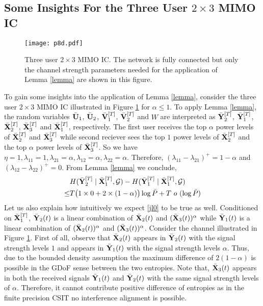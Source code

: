 \documentclass[11pt]{article}
\begin{document}
\subsection{Some Insights For the Three User $2\times3$ MIMO IC}
\begin{figure}[!h]
\centerline{\texttt{[image: p8d.pdf]}}
\caption{ Three user $2\times3$ MIMO IC. The network is fully connected but only the channel strength parameters needed for the application of Lemma \ref{lemma} are shown in this figure.}\label{fig:intuit-}
\end{figure}
To gain some insights into the application of Lemma \ref{lemma}, consider the three user $2\times3$ MIMO IC illustrated in Figure \ref{fig:intuit-} for $\alpha\le1$. To apply Lemma \ref{lemma}, the random variables  $\bar{\bf U}_1$, $\bar{\bf U}_2$, $\bar{\bf V}_1^{[T]}$, $\bar{\bf V}_2^{[T]}$ and $W$ are interpreted as $\bar{\bf Y}_2^{[T]}$, $\bar{\bf Y}_1^{[T]}$, $\bar{\bf X}_2^{[T]}$, $\bar{\bf X}_3^{[T]}$ and $\bar{\bf X}_1^{[T]}$, respectively. The first user receives the top $\alpha$ power levels of $\bar{\bf X}_2^{[T]}$ and $\bar{\bf X}_3^{[T]}$ while second reciever sees  the top $1$ power levels of $\bar{\bf X}_2^{[T]}$ and  the top $\alpha$ power levels of $\bar{\bf X}_3^{[T]}$.  So we have $\eta=1, \lambda_{11}=1, \lambda_{21}=\alpha, \lambda_{12}=\alpha, \lambda_{22}=\alpha$. Therefore, $(\lambda_{11}-\lambda_{21})^+=1-\alpha$ and $(\lambda_{12}-\lambda_{22})^+=0$. From Lemma \ref{lemma} we conclude,
\begin{align}
&H(\bar{\bf Y}_2^{[T]}\mid \bar{\bf X}_1^{[T]},\mathcal{G})-H(\bar{\bf Y}_1^{[T]}\mid \bar{\bf X}_1^{[T]},\mathcal{G})\nonumber\\
\le&T\big(1\times 0+2\times(1-\alpha)\big)\log{\bar{P}}+T~o~(\log{\bar{P}})\label{jl0}
\end{align}
  Let us also explain how intuitively we expect \eqref{jl0} to be true as well. Conditioned on $\bar{\bf X}_{1}^{[T]}$, $\bar{\bf Y}_{2}(t)$ is a linear combination of $\bar{\bf X}_{2}(t)$ and $(\bar{\bf X}_{3}(t))^{\alpha}$ while $\bar{\bf Y}_{1}(t)$ is a linear combination of $(\bar{\bf X}_{2}(t))^{\alpha}$ and $(\bar{\bf X}_{3}(t))^{\alpha}$. Consider the channel illustrated in Figure \ref{fig:intuit-}. First of all, observe that $\bar{\bf X}_{2}(t)$ appears in $\bar{\bf Y}_{2}(t)$ with the signal strength levels $1$ and appears in $\bar{\bf Y}_{1}(t)$ with the signal strength levels $\alpha$. Thus, due to the bounded density assumption the maximum difference of $2(1-\alpha)$ is possible in the GDoF sense between the two entropies. Note that, $\bar{\bf X}_{3}(t)$ appears in both the received signals  $\bar{\bf Y}_{1}(t)$ and  $\bar{\bf Y}_{2}(t)$ with the same signal strength levels of $\alpha$. Therefore, it cannot contribute positive difference of entropies as in the finite precision CSIT no interference alignment is possible.
  
\end{document}
